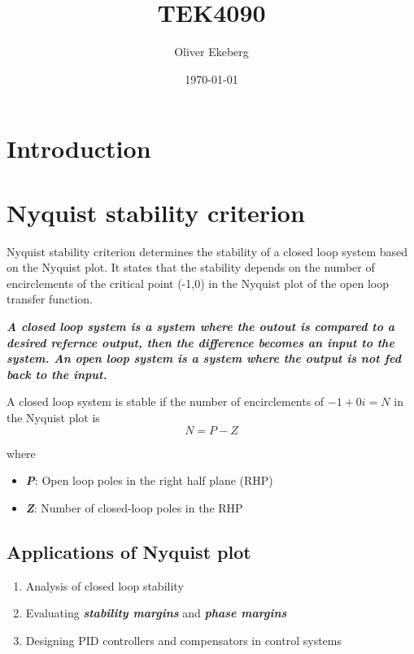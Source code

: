 \documentclass[11pt]{article}
\title{TEK4090}
\author{Oliver Ekeberg}
\date{\today}
\begin{document}
\maketitle

\section{Introduction}



\section{Nyquist stability criterion}

Nyquist stability criterion determines the stability of a closed loop system based on the Nyquist plot. It states that the stability depends on the number of encirclements of the critical point (-1,0) in the Nyquist plot of the open loop transfer function.


\textbf{\textit{A closed loop system is a system where the outout is compared to a desired refernce output, then the difference becomes an input to the system. An open loop system is a system where the output is not fed back to the input.}}





A closed loop system is stable if the number of encirclements of $ -1 + 0i = N$ in the Nyquist plot is  \[
N = P - Z
\] 

where

\begin{itemize}
    \item \textbf{\textit{P}}: Open loop poles in the right half plane (RHP)
    \item \textbf{\textit{Z}}: Number of closed-loop poles in the RHP
\end{itemize}


\subsection{Applications of Nyquist plot}

\begin{enumerate}
    \item Analysis of closed loop stability
    \item Evaluating \textbf{\textit{stability margins}} and \textbf{\textit{phase margins}}
    \item Designing PID controllers and compensators in control systems
\end{enumerate}
\end{document}
